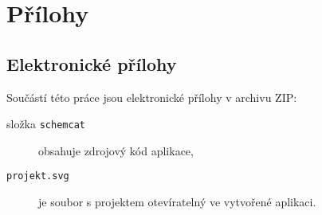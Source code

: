 \documentclass[12pt,a4paper]{report}
\newif\iffinal
\let\openright=\clearpage
\begin{document}
\iffinal
  

  \tableofcontents

  
  
  
  
  
  

  

  \listoffigures

  \listoftables
\else

  \tableofcontents
  
  
  
  
  
  
  
  \listoffigures
  \listoftables

\fi



\appendix
\chapter{Přílohy}

\section{Elektronické přílohy}\label{appendix:electronic}
Součástí této práce jsou elektronické přílohy v archivu ZIP:
\begin{description}
  \item[složka \texttt{schemcat}] obsahuje zdrojový kód aplikace,
  \item[\texttt{projekt.svg}] je soubor s projektem otevíratelný ve vytvořené aplikaci.
\end{description}

\openright
\end{document}
